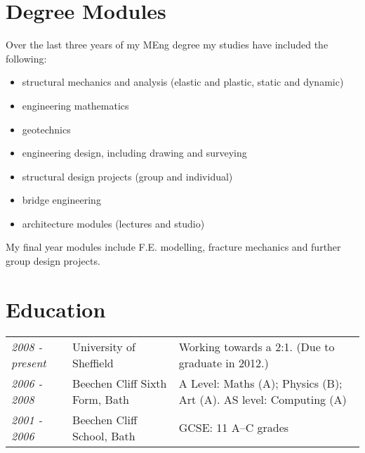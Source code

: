\documentclass[oneside,a4paper]{article}
\begin{document}
\section*{Degree Modules}

Over the last three years of my MEng degree my studies have included the following:

\begin{itemize}
\item structural mechanics and analysis (elastic and plastic, static and dynamic)
\item engineering mathematics
\item geotechnics
\item engineering design, including drawing and surveying
\item structural design projects (group and individual)
\item bridge engineering
\item architecture modules (lectures and studio)
\end{itemize}

My final year modules include F.E. modelling, fracture mechanics and further group design projects.

\section*{Education}

\hspace{-6pt}\begin{tabular}{>{\it}lll}
2008 - present & University of Sheffield & Working towards a 2:1. (Due to graduate in 2012.) \\
2006 - 2008 & Beechen Cliff Sixth Form, Bath & A Level: Maths (A); Physics (B); Art (A). AS level: Computing (A) \\
2001 - 2006 & Beechen Cliff School, Bath & GCSE: 11 A--C grades
\end{tabular}
\end{document}
